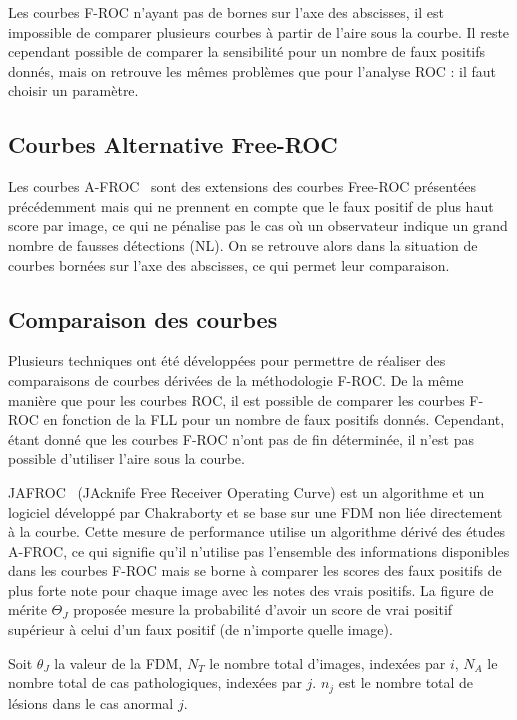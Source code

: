 Les courbes F-ROC n'ayant pas de bornes sur l’axe des abscisses, il est impossible de comparer plusieurs courbes à partir de l'aire sous la courbe. Il reste cependant possible de comparer la sensibilité pour un nombre de faux positifs donnés, mais on retrouve les mêmes problèmes que pour l'analyse ROC : il faut choisir un paramètre.

\subsection{Courbes Alternative Free-ROC}

Les courbes A-FROC~\cite{chakraborty1990free} sont des extensions des courbes Free-ROC présentées précédemment mais qui ne prennent en compte que le faux positif de plus haut score par image, ce qui ne pénalise pas le cas où un observateur indique un grand nombre de fausses détections (NL). On se retrouve alors dans la situation de courbes bornées sur l'axe des abscisses, ce qui permet leur comparaison.

\subsection{Comparaison des courbes}
\label{lab:AFROC}
Plusieurs techniques ont été développées pour permettre de réaliser des comparaisons de courbes dérivées de la méthodologie F-ROC. De la même manière que pour les courbes ROC, il est possible de comparer les courbes F-ROC en fonction de la FLL pour un nombre de faux positifs donnés. Cependant, étant donné que les courbes F-ROC n'ont pas de fin déterminée, il n'est pas possible d'utiliser l'aire sous la courbe. 

JAFROC~\cite{chakraborty2004observer} (JAcknife Free Receiver Operating Curve) est un algorithme et un logiciel développé par Chakraborty et se base sur une FDM non liée directement à la courbe. Cette mesure de performance utilise un algorithme dérivé des études A-FROC, ce qui signifie qu'il n'utilise pas l'ensemble des informations disponibles dans les courbes F-ROC mais se borne à comparer les scores des faux positifs de plus forte note pour chaque image avec les notes des vrais positifs. La figure de mérite $\Theta_J$ proposée mesure la probabilité d'avoir un score de vrai positif supérieur à celui d'un faux positif (de n'importe quelle image).

Soit $\theta_J$ la valeur de la FDM, $N_T$ le nombre total d'images, indexées par $i$, $N_A$ le nombre total de cas pathologiques, indexées par $j$. $n_j$ est le nombre total de lésions dans le cas anormal $j$.

